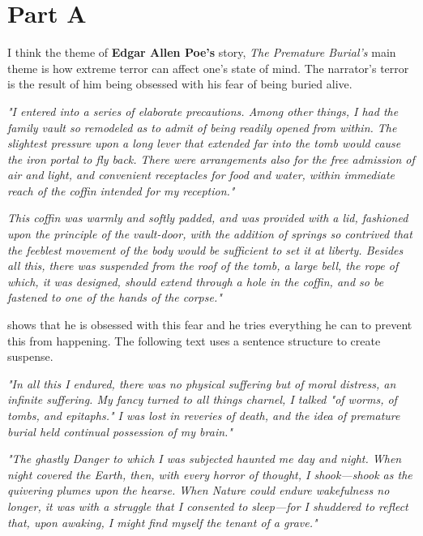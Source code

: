\section*{Part A}
\label{sec:part_a}

I think the theme of \textbf{Edgar Allen Poe's} story, \textit{The Premature
Burial's} main theme is how extreme terror can affect one's state of mind.
The narrator's terror is the result of him being obsessed with his fear of being
buried alive.

\begin{center}
  \textit{"I entered into a series of elaborate precautions. Among other things,
  I had the family vault so remodeled as to admit of being readily opened from
  within. The slightest pressure upon a long lever that extended far into the tomb
  would cause the iron portal to fly back. There were arrangements also for the
  free admission of air and light, and convenient receptacles for food and water,
  within immediate reach of the coffin intended for my reception."}
  
  \textit{This coffin was warmly and softly padded, and was provided with a lid,
  fashioned upon the principle of the vault-door, with the addition of springs
  so contrived that the feeblest movement of the body would be sufficient to set
  it at liberty. Besides all this, there was suspended from the roof of the tomb,
  a large bell, the rope of which, it was designed, should extend through a hole
  in the coffin, and so be fastened to one of the hands of the corpse."}
\end{center}

\noindent shows that he is obsessed with this fear and he tries everything he
can to prevent this from happening. The following text uses a sentence structure
to create suspense.

\begin{center}
  \textit{"In all this I endured, there was no physical suffering but of moral
  distress, an infinite suffering. My fancy turned to all things charnel, I talked
  "of worms, of tombs, and epitaphs." I was lost in reveries of death, and the
  idea of premature burial held continual possession of my brain."}

  \textit{"The ghastly Danger to which I was subjected haunted me day and night.
  When night covered the Earth, then, with every horror of thought, I shook—shook
  as the quivering plumes upon the hearse. When Nature could endure wakefulness no
  longer, it was with a struggle that I consented to sleep—for I shuddered to
  reflect that, upon awaking, I might find myself the tenant of a grave."}
\end{center}

